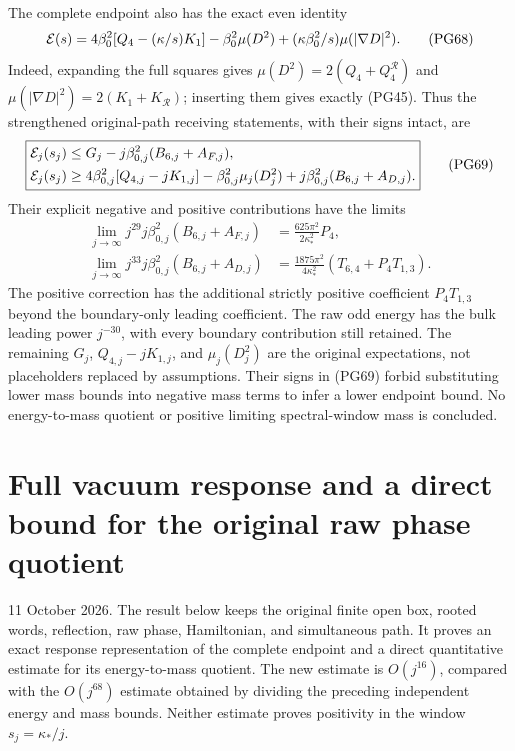 \documentclass[11pt]{article}
\begin{document}
The complete endpoint also has the exact even identity
\[
 {\cal E}(s)=
 4\beta_0^2[Q_4-(\kappa/s)K_1]
          -\beta_0^2\mu(D^2)
          +(\kappa\beta_0^2/s)\mu(|\nabla D|^2).
 \tag{PG68}
\]
Indeed, expanding the full squares gives
\(\mu(D^2)=2(Q_4+Q_4^{\mathcal R})\) and
\(\mu(|\nabla D|^2)=2(K_1+K_{\mathcal R})\);
inserting them gives exactly (PG45). Thus the strengthened
original-path receiving statements, with their signs intact, are
\[
 \boxed{\begin{aligned}
 {\cal E}_j(s_j)&\le
      G_j-j\beta_{0,j}^2(B_{6,j}+A_{F,j}),\\
 {\cal E}_j(s_j)&\ge
      4\beta_{0,j}^2[Q_{4,j}-jK_{1,j}]
       -\beta_{0,j}^2\mu_j(D_j^2)
       +j\beta_{0,j}^2(B_{6,j}+A_{D,j}).
 \end{aligned}}\tag{PG69}
\]
Their explicit negative and positive contributions have the limits
\[
 \begin{aligned}
 \lim_{j\to\infty}j^{29}
       j\beta_{0,j}^2(B_{6,j}+A_{F,j})
           &=\frac{625\pi^2}{2\kappa_*^2}P_4,\\
 \lim_{j\to\infty}j^{33}
       j\beta_{0,j}^2(B_{6,j}+A_{D,j})
           &=\frac{1875\pi^2}{4\kappa_*^2}
                                      (T_{6,4}+P_4T_{1,3}) .
 \end{aligned}\tag{PG70}
\]
The positive correction has the additional strictly positive
coefficient \(P_4T_{1,3}\) beyond the boundary-only leading
coefficient. The raw odd energy has the bulk leading power
\(j^{-30}\), with every boundary contribution still retained.
The remaining \(G_j\), \(Q_{4,j}-jK_{1,j}\), and \(\mu_j(D_j^2)\)
are the original expectations, not placeholders replaced by
assumptions. Their signs in (PG69) forbid substituting lower mass
bounds into negative mass terms to infer a lower endpoint bound.
No energy-to-mass quotient or positive limiting spectral-window
mass is concluded.
\clearpage
\section*{Full vacuum response and a direct bound for the original raw phase quotient}

11 October 2026. The result below keeps the original finite open box, rooted words, reflection, raw phase, Hamiltonian, and simultaneous path. It proves an exact response representation of the complete endpoint and a direct quantitative estimate for its energy-to-mass quotient. The new estimate is \(O(j^{16})\), compared with the \(O(j^{68})\) estimate obtained by dividing the preceding independent energy and mass bounds. Neither estimate proves positivity in the window \(s_j=\kappa_*/j\).
\end{document}
